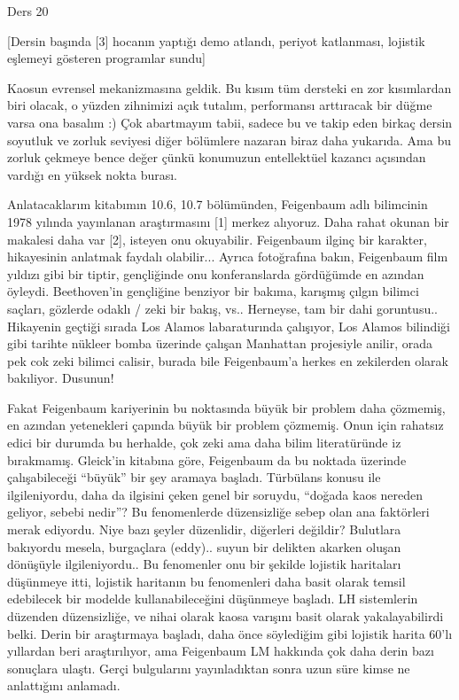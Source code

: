 \documentclass[12pt,fleqn]{article}\usepackage{../../common}
\begin{document}
Ders 20

[Dersin başında [3] hocanın yaptığı demo atlandı, periyot katlanması, lojistik
eşlemeyi gösteren programlar sundu]

Kaosun evrensel mekanizmasına geldik. Bu kısım tüm dersteki en zor
kısımlardan biri olacak, o yüzden zihnimizi açık tutalım, performansı
arttıracak bir düğme varsa ona basalım :) Çok abartmayım tabii, sadece bu
ve takip eden birkaç dersin soyutluk ve zorluk seviyesi diğer bölümlere
nazaran biraz daha yukarıda. Ama bu zorluk çekmeye bence değer çünkü
konumuzun entellektüel kazancı açısından vardığı en yüksek nokta
burası. 

Anlatacaklarım kitabımın 10.6, 10.7 bölümünden, Feigenbaum adlı bilimcinin 1978
yılında yayınlanan araştırmasını [1] merkez alıyoruz. Daha rahat okunan bir
makalesi daha var [2], isteyen onu okuyabilir. Feigenbaum ilginç bir karakter,
hikayesinin anlatmak faydalı olabilir... Ayrıca fotoğrafına bakın, Feigenbaum
film yıldızı gibi bir tiptir, gençliğinde onu konferanslarda gördüğümde en
azından öyleydi. Beethoven'in gençliğine benziyor bir bakıma, karışmış çılgın
bilimci saçları, gözlerde odaklı / zeki bir bakış, vs.. Herneyse, tam bir dahi
goruntusu.. Hikayenin geçtiği sırada Los Alamos labaraturında çalışıyor, Los
Alamos bilindiği gibi tarihte nükleer bomba üzerinde çalışan Manhattan
projesiyle anilir, orada pek cok zeki bilimci calisir, burada bile Feigenbaum'a
herkes en zekilerden olarak bakıliyor. Dusunun!

Fakat Feigenbaum kariyerinin bu noktasında büyük bir problem daha çözmemiş, en
azından yetenekleri çapında büyük bir problem çözmemiş. Onun için rahatsız edici
bir durumda bu herhalde, çok zeki ama daha bilim literatüründe iz bırakmamış.
Gleick'in kitabına göre, Feigenbaum da bu noktada üzerinde çalışabileceği
``büyük'' bir şey aramaya başladı. Türbülans konusu ile ilgileniyordu, daha da
ilgisini çeken genel bir soruydu, ``doğada kaos nereden geliyor, sebebi nedir''?
Bu fenomenlerde düzensizliğe sebep olan ana faktörleri merak ediyordu. Niye bazı
şeyler düzenlidir, diğerleri değildir? Bulutlara bakıyordu mesela, burgaçlara
(eddy).. suyun bir delikten akarken oluşan dönüşüyle ilgileniyordu.. Bu
fenomenler onu bir şekilde lojistik haritaları düşünmeye itti, lojistik
haritanın bu fenomenleri daha basit olarak temsil edebilecek bir modelde
kullanabileceğini düşünmeye başladı. LH sistemlerin düzenden düzensizliğe, ve
nihai olarak kaosa varışını basit olarak yakalayabilirdi belki. Derin bir
araştırmaya başladı, daha önce söylediğim gibi lojistik harita 60'lı yıllardan
beri araştırılıyor, ama Feigenbaum LM hakkında çok daha derin bazı sonuçlara
ulaştı. Gerçi bulgularını yayınladıktan sonra uzun süre kimse ne anlattığını
anlamadı.
\end{document}
